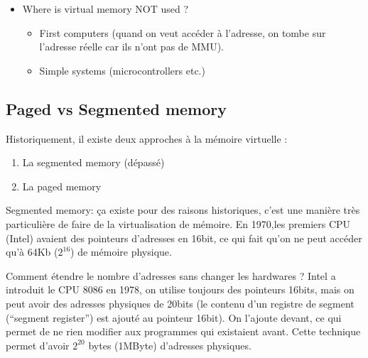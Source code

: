 \bigskip
\begin{itemize}
    \item Where is virtual memory NOT used ?
        \begin{itemize}
            \item First computers (quand on veut accéder à l'adresse, on
                tombe sur l'adresse réelle car ils n'ont pas de MMU).
            \item Simple systems (microcontrollers etc.)
        \end{itemize}
\end{itemize}
\bigskip

\subsection{Paged vs Segmented memory}

Historiquement, il existe deux approches à la mémoire virtuelle :

\begin{enumerate}
    \item La segmented memory (dépassé)
    \item La paged memory
\end{enumerate}

Segmented memory: ça existe pour des raisons historiques, c'est une
manière très particulière de faire de la virtualisation de mémoire. En
1970,les premiers CPU (Intel) avaient des pointeurs d'adresses en
16bit, ce qui fait qu'on ne peut accéder qu'à 64Kb ($2^{16}$) de mémoire physique.
\newline

Comment étendre le nombre d'adresses sans changer les hardwares ? Intel
a introduit le CPU 8086 en 1978, on utilise toujours des pointeurs
16bits, mais on peut avoir des adresses physiques de 20bits (le contenu
d'un registre de segment (\enquote{segment register}) est ajouté au
pointeur 16bit). On l'ajoute devant, ce qui permet de ne rien modifier
aux programmes qui existaient avant. Cette technique permet d'avoir
$2^{20}$ bytes (1MByte) d'adresses physiques.\newline


